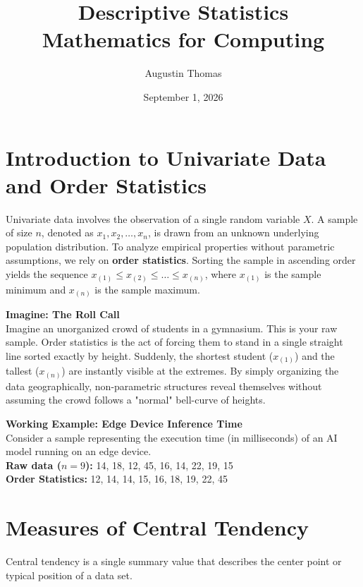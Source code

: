 \documentclass[12pt]{article}
\title{\textbf{\LARGE Descriptive Statistics}\\ \large Mathematics for Computing}
\author{Augustin Thomas}
\date{September 1, 2026}
\begin{document}
\maketitle

\section*{Introduction to Univariate Data and Order Statistics}
Univariate data involves the observation of a single random variable $X$. A sample of size $n$, denoted as $x_1, x_2, \dots, x_n$, is drawn from an unknown underlying population distribution. To analyze empirical properties without parametric assumptions, we rely on \textbf{order statistics}. Sorting the sample in ascending order yields the sequence $x_{(1)} \le x_{(2)} \le \dots \le x_{(n)}$, where $x_{(1)}$ is the sample minimum and $x_{(n)}$ is the sample maximum.

\vspace{0.5em}
\noindent\textbf{Imagine: The Roll Call}\\
Imagine an unorganized crowd of students in a gymnasium. This is your raw sample. Order statistics is the act of forcing them to stand in a single straight line sorted exactly by height. Suddenly, the shortest student ($x_{(1)}$) and the tallest ($x_{(n)}$) are instantly visible at the extremes. By simply organizing the data geographically, non-parametric structures reveal themselves without assuming the crowd follows a "normal" bell-curve of heights.

\vspace{0.5em}
\noindent\textbf{Working Example: Edge Device Inference Time}\\
Consider a sample representing the execution time (in milliseconds) of an AI model running on an edge device.\\
\textbf{Raw data ($n=9$):} 14, 18, 12, 45, 16, 14, 22, 19, 15\\
\textbf{Order Statistics:} 12, 14, 14, 15, 16, 18, 19, 22, 45


\section*{Measures of Central Tendency}
Central tendency is a single summary value that describes the center point or typical position of a data set.
\end{document}
